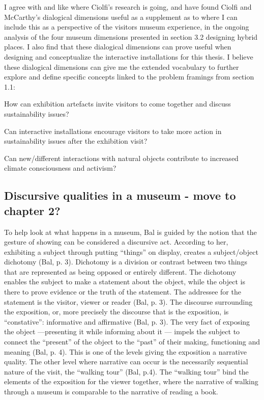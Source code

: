 I agree with and like where Ciolfi’s research is going, and have found Ciolfi and McCarthy’s dialogical dimensions useful as a supplement as to where I can include this as a perspective of the visitors museum experience, in the ongoing analysis of the four museum dimensions presented in section 3.2 designing hybrid places. I also find that these dialogical dimensions can prove useful when designing and conceptualize the interactive installations for this thesis. I believe these dialogical dimensions can give me the extended vocabulary to further explore and define specific concepts linked to the problem framings from section 1.1:

How can exhibition artefacts invite visitors to come together and discuss sustainability issues?\par
Can interactive installations encourage visitors to take more action in sustainability issues after the exhibition visit?\par
Can new/different interactions with natural objects contribute to increased climate consciousness and activism?\par


\subsection{Discursive qualities in a museum - move to chapter 2?}
\par

To help look at what happens in a museum, Bal is guided by the notion that the gesture of showing can be considered a discursive act. According to her, exhibiting a subject through putting “things” on display, creates a subject/object dichotomy (Bal, p. 3). Dichotomy is a division or contrast between two things that are represented as being opposed or entirely different. The dichotomy enables the subject to make a statement about the object, while the object is there to prove evidence or the truth of the statement. The addressee for the statement is the visitor, viewer or reader (Bal, p. 3). The discourse surrounding the exposition, or, more precisely the discourse that is the exposition, is “constative”: informative and affirmative (Bal, p. 3). The very fact of exposing the object —presenting it while informing about it — impels the subject to connect the “present” of the object to the “past” of their making, functioning and meaning (Bal, p. 4). This is one of the levels giving the exposition a narrative quality. The other level where narrative can occur is the necessarily sequential nature of the visit, the “walking tour” (Bal, p.4). The “walking tour” bind the elements of the exposition for the viewer together, where the narrative of walking through a museum is comparable to the narrative of reading a book.

